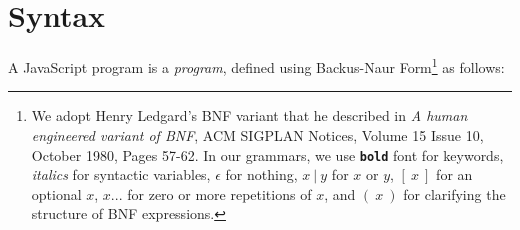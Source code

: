 \section{Syntax}

A JavaScript program is a \emph{program}, defined using Backus-Naur Form\footnote{
We adopt Henry Ledgard's BNF variant that he described in
\emph{A human engineered variant of BNF}, ACM SIGPLAN Notices, Volume 15 Issue 10,
October 1980, Pages 57-62. In our grammars, we use \textbf{\texttt{bold}} font for keywords,
{\it italics} for syntactic variables, $\epsilon$ for nothing,
$x\ |\ y$ for $x$ or $y$, $[\ x\ ]$ for an optional $x$,
$ x ...$ for zero or more repetitions of $x$, and $(\ x\ )$ for clarifying the structure of BNF expressions.}
as follows:
